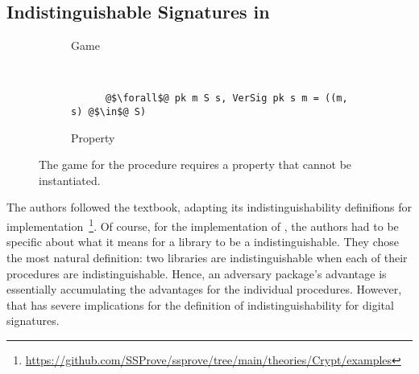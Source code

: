 \subsection{Indistinguishable Signatures in \ssprove}
\begin{figure}
	\centering
  \begin{subfigure}[0]{\columnwidth}
    \centering
    
    \caption{Game}
    \label{fig:versig:game}
  \end{subfigure}
\\[0.3cm]
	\begin{subfigure}[0]{0.7\columnwidth}
    \centering
%    
		\begin{verbatim}
      @$\forall$@ pk m S s, VerSig pk s m = ((m, s) @$\in$@ S)
		\end{verbatim}

    \caption{Property}
    \label{fig:versig:prop}
  \end{subfigure}

	\caption{
    The game for the \eversig procedure requires a
    property that cannot be instantiated.
  }
	\label{fig:versig}
\end{figure}

%
The \ssprove authors followed the \joc textbook, adapting its indistinguishability
definifions for implementation~\cite{ssprove}\footnote{\url{https://github.com/SSProve/ssprove/tree/main/theories/Crypt/examples}}.
%
%
Of course, for the implementation of \ssprove, the authors
had to be specific about what it means for a library to be a 
indistinguishable.
%
They chose the most natural definition:
two libraries are indistinguishable when each of their
procedures are indistinguishable.
%
Hence, an adversary package's advantage is essentially
accumulating the advantages for the individual procedures.
%
However, that has severe implications for the definition
of indistinguishability for digital signatures.
%

